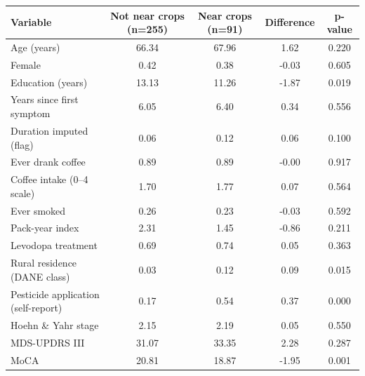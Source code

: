 \begin{tabular}{lcccc}
\hline\hline
Variable & Not near crops (n=255) & Near crops (n=91) & Difference & p-value \\
\hline
Age (years) & 66.34 & 67.96 & 1.62 & 0.220 \\
Female & 0.42 & 0.38 & -0.03 & 0.605 \\
Education (years) & 13.13 & 11.26 & -1.87 & 0.019 \\
Years since first symptom & 6.05 & 6.40 & 0.34 & 0.556 \\
Duration imputed (flag) & 0.06 & 0.12 & 0.06 & 0.100 \\
Ever drank coffee & 0.89 & 0.89 & -0.00 & 0.917 \\
Coffee intake (0--4 scale) & 1.70 & 1.77 & 0.07 & 0.564 \\
Ever smoked & 0.26 & 0.23 & -0.03 & 0.592 \\
Pack-year index & 2.31 & 1.45 & -0.86 & 0.211 \\
Levodopa treatment & 0.69 & 0.74 & 0.05 & 0.363 \\
Rural residence (DANE class) & 0.03 & 0.12 & 0.09 & 0.015 \\
Pesticide application (self-report) & 0.17 & 0.54 & 0.37 & 0.000 \\
Hoehn \& Yahr stage & 2.15 & 2.19 & 0.05 & 0.550 \\
MDS-UPDRS III & 31.07 & 33.35 & 2.28 & 0.287 \\
MoCA & 20.81 & 18.87 & -1.95 & 0.001 \\
\hline\hline
\end{tabular}
